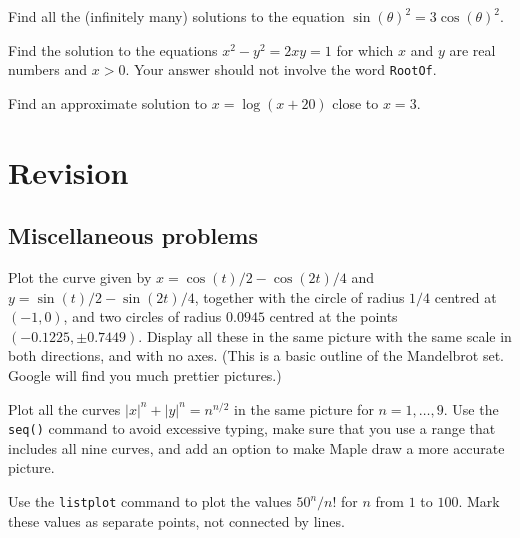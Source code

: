 \documentclass[a4paper,10pt]{amsbook}
\numberwithin{example}{chapter}
\begin{document}
\begin{exercise}
 Find all the (infinitely many) solutions to the equation
 $\sin(\theta)^2=3\cos(\theta)^2$. 
\end{exercise}

\begin{exercise}
 Find the solution to the equations $x^2-y^2=2xy=1$ for
 which $x$ and $y$ are real numbers and $x>0$.  Your answer
 should not involve the word \verb~RootOf~. 
\end{exercise}

\begin{exercise}
 Find an approximate solution to $x=\log(x+20)$ close to
 $x=3$.  
\end{exercise}

\chapter{Revision} 

\section{Miscellaneous problems}

\begin{exercise}
 Plot the curve given by $x=\cos(t)/2-\cos(2t)/4$ and
 $y=\sin(t)/2-\sin(2t)/4$, together with the circle of radius $1/4$
 centred at $(-1,0)$, and two circles of radius $0.0945$ centred at
 the points $(-0.1225,\pm 0.7449)$.  Display all these in the same
 picture with the same scale in both directions, and with no axes.
 (This is a basic outline of the Mandelbrot set.  Google will find you
 much prettier pictures.)
\end{exercise}

\begin{exercise}
 Plot all the curves $|x|^n+|y|^n=n^{n/2}$ in the same picture for
 $n=1,\dotsc,9$.  Use the \verb~seq()~ command to avoid excessive
 typing, make sure that you use a range that includes all nine curves,
 and add an option to make Maple draw a more accurate picture.
\end{exercise}

\begin{exercise}
 Use the \verb~listplot~ command to plot the values $50^n/n!$ for $n$
 from $1$ to $100$.  Mark these values as separate points, not
 connected by lines.
\end{exercise}
\end{document}
